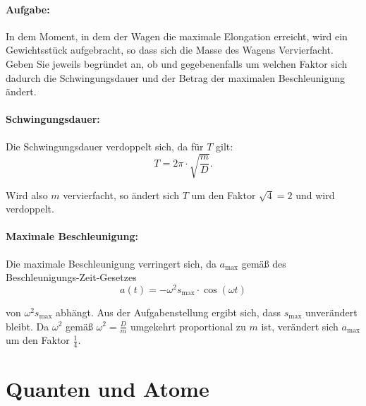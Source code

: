 \documentclass{ajc}
\begin{document}
	\paragraph{Aufgabe:}In dem Moment, in dem der Wagen die maximale Elongation erreicht, wird ein Gewichtsstück aufgebracht, so dass sich die Masse des Wagens Vervierfacht. Geben Sie jeweils begründet an, ob und gegebenenfalls um welchen Faktor sich dadurch die Schwingungsdauer und der Betrag der maximalen Beschleunigung ändert.
	
	\paragraph{Schwingungsdauer:} Die Schwingungsdauer verdoppelt sich, da für $T$ gilt:
	\begin{equation}
		T = 2\pi \cdot \sqrt{\frac{m}{D}}.
	\end{equation}
	
	Wird also $m$ vervierfacht, so ändert sich $T$ um den Faktor $\sqrt{4} = 2$ und wird verdoppelt.
	
	\paragraph{Maximale Beschleunigung:} Die maximale Beschleunigung verringert sich, da $a_\text{max}$ gemäß des Beschleunigungs-Zeit-Gesetzes 
	\begin{equation}
		a(t) = -\omega^2 s_\text{max} \cdot \cos\left(\omega t\right)
	\end{equation}
	
	von $\omega^2 s_\text{max}$ abhängt. Aus der Aufgabenstellung ergibt sich, dass $s_\text{max}$ unverändert bleibt. Da $\omega^2$ gemäß $\omega^2 = \frac{D}{m}$ umgekehrt proportional zu $m$ ist, verändert sich $a_\text{max}$ um den Faktor $\frac{1}{4}$.
	
	\section{Quanten und Atome}
\end{document}
